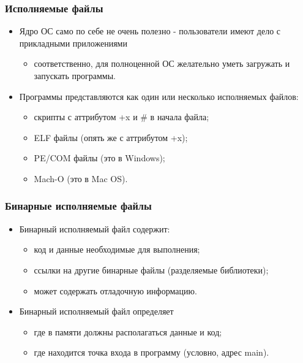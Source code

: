 \begin{frame}
\frametitle{Исполняемые файлы}
\begin{itemize}
  \item Ядро ОС само по себе не очень полезно - пользователи имеют дело с
  прикладными приложениями
  \begin{itemize}
    \item соответственно, для полноценной ОС желательно уметь загружать и
    запускать программы.
  \end{itemize}
  \item Программы представляются как один или несколько исполняемых файлов:
  \begin{itemize}
    \item скрипты с аттрибутом +x и \#\! в начала файла;
    \item ELF файлы (опять же с аттрибутом +x);
    \item PE/COM файлы (это в Windows);
    \item Mach-O (это в Mac OS).
  \end{itemize}
\end{itemize}
\end{frame}

\begin{frame}
\frametitle{Бинарные исполняемые файлы}
\begin{itemize}
  \item Бинарный исполняемый файл содержит:
  \begin{itemize}
    \item код и данные необходимые для выполнения;
    \item ссылки на другие бинарные файлы (разделяемые библиотеки);
    \item может содержать отладочную информацию.
  \end{itemize}
  \item Бинарный исполняемый файл определяет
  \begin{itemize}
    \item где в памяти должны располагаться данные и код;
    \item где находится точка входа в программу (условно, адрес main).
  \end{itemize}
\end{itemize}
\end{frame}

